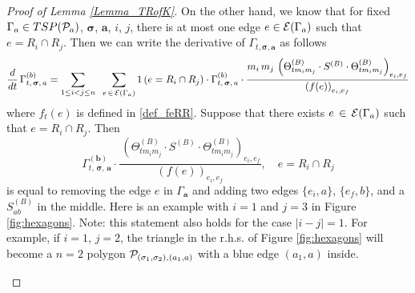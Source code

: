\documentclass[10pt,reqno]{article}
\theoremstyle{plain} %
\theoremstyle{remark}
\numberwithin{equation}{section}
\begin{document}
\begin{proof}[Proof of Lemma \ref{Lemma_TRofK}]
 On the other hand, we know that for fixed $\Gamma_\textbf{a}\in TSP({\cal P}_\textbf{a})$, $\boldsymbol{\sigma}$, $\textbf{a}$, $i$, $j$, there is at most one edge $e\in {\cal E}(\Gamma_\textbf{a})$ such that $e=R_i \cap R_j$. Then we can write the derivative of $\Gamma_{t, \boldsymbol{\sigma}, \textbf{a}}$  as follows
\begin{equation}\label{9aksufuo44}
  \frac{d}{dt} \, \Gamma^{(\textbf{b})}_{t, \,\boldsymbol{\sigma}
       ,\, \textbf{a}} = \sum_{1\le i < j\le n }\; \; \sum_{e\,\in \,{\cal E}(\Gamma_\textbf{a})} \textbf{1} \left(e=R_i\cap R_j\right) 
       \cdot \Gamma^{(\textbf{b})}_{t, \,\boldsymbol{\sigma}
       ,\, \textbf{a}}
       \cdot \frac{m_i \,m_j \,\left(\Theta^{(B)}_{t m_i m_j} \cdot S^{(B)} \cdot \Theta^{(B)}_{t m_i m_j}\right)_{e_i,e_f}}{\left(f(e)\right)_{e_i,e_f}} 
\end{equation}
where $f_t(e)$ is defined in \eqref{def_feRR}.
Suppose  that there  exists $e\,\in \,{\cal E}(\Gamma_\textbf{a})$ such that  $e=R_i\cap R_j$.  Then 
$$
\Gamma^{(\textbf{b})}_{t, \,\boldsymbol{\sigma}
       ,\, \textbf{a}}
       \cdot \frac{  \,\left(\Theta^{(B)}_{t m_i m_j} \cdot S^{(B)} \cdot \Theta^{(B)}_{t m_i m_j}\right)_{e_i,e_f}}{\left(f(e)\right)_{e_i,e_f}} ,\quad e=R_i\cap R_j 
       $$
    is equal to removing the edge $e$ in $\Gamma_\textbf{a}$ and adding two edges $\{e_i, a\}$, $\{e_f, b\}$, and a $S^{(B)}_{ab}$ in the middle. Here is an example with $i=1$ and $j=3$ in Figure \ref{fig:hexagons}. Note: this statement also holds for the case $|i-j|=1$. For example, if $i=1$, $j=2$, the triangle in the r.h.s. of Figure \ref{fig:hexagons} will become a $n=2$ polygon ${\cal P}_{(\sigma_1,\sigma_2), (a_1,a)}$ with a blue edge $(a_1,a)$ inside. 
   \begin{figure}[h!]
   \hspace{0.5in}
\end{figure}
\end{proof}
\end{document}
